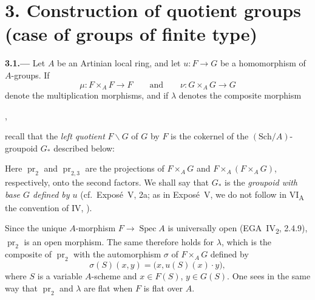
\section*{3. Construction of quotient groups (case of groups of finite type)}
\label{sec:sga3-VIA-3}

\medskip
{}\label{par:sga3-VIA-3.1}%
\noindent\textbf{3.1.---}
Let \(A\) be an Artinian local ring, and let
\(u:F\to G\) be a homomorphism of \(A\)-groups. If
\[
  \mu:F\times_A F\longrightarrow F
  \qquad\text{and}\qquad
  \nu:G\times_A G\longrightarrow G
\]
denote the multiplication morphisms, and if \(\lambda\) denotes the
composite morphism
\begin{center}
  \label{diag:sga3-VIA-3.1-lambda-composite}%
  ,
\end{center}
recall that the \emph{left quotient} \(F\backslash G\) of \(G\) by
\(F\) is the cokernel of the \((\mathrm{Sch}/A)\)-groupoid \(G_*\)
described below:
\begin{center}
  \label{diag:sga3-VIA-3.1-groupoid}%
\end{center}
Here \(\operatorname{pr}_2\) and \(\operatorname{pr}_{2,3}\) are the
projections of \(F\times_A G\) and
\(F\times_A(F\times_A G)\), respectively, onto the second factors.
We shall say that \(G_*\) is the \emph{groupoid with base \(G\)
defined by \(u\)} (cf.\ Expos\'e~V, 2a; as in Expos\'e~V, we do
not follow in VI\textsubscript{A} the convention of IV, ).

Since the unique \(A\)-morphism \(F\to\operatorname{Spec}A\) is
universally open (EGA~IV\textsubscript{2}, 2.4.9),
\(\operatorname{pr}_2\) is an open morphism. The same therefore holds
for \(\lambda\), which is the composite of \(\operatorname{pr}_2\)
with the automorphism \(\sigma\) of \(F\times_A G\) defined by
\[
  \sigma(S)(x,y)=\bigl(x,u(S)(x)\cdot y\bigr),
\]
where \(S\) is a variable \(A\)-scheme and
\(x\in F(S)\), \(y\in G(S)\). One sees in the same way that
\(\operatorname{pr}_2\) and \(\lambda\) are flat when \(F\) is flat
over \(A\).

